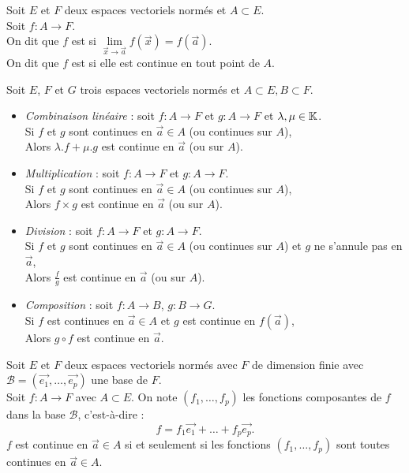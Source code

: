 \documentclass{book}
\begin{document}
\begin{Definition}[Continuité]
Soit $E$ et $F$ deux espaces vectoriels normés et $A\subset E$.\\
Soit $f:A\to F$.\\
On dit que $f$ est  si $\lim\limits_{\vec{x}\to\vec{a} } f(\vec{x})= f(\vec{a})$.\\
On dit que $f$ est  si elle est continue en tout point de $A$.
\end{Definition}
\begin{Definition}
Soit $E$, $F$ et $G$ trois espaces vectoriels normés et $A\subset E, B\subset F$.
\begin{itemize}
\item \textit{Combinaison linéaire} :  soit $f:A\to F$ et $g:A\to F$ et $\lambda,\mu\in\mathbb{K}$.\\
Si $f$ et $g$ sont continues en $\vec{a}\in A$ (ou continues sur $A$),\\
Alors $\lambda.f + \mu.g$ est continue en $\vec{a}$ (ou sur $A$).
\item\textit{Multiplication} :  soit $f:A\to F$ et $g:A\to F$.\\
Si $f$ et $g$ sont continues en $\vec{a}\in A$ (ou continues sur $A$),\\
Alors $f \times g$ est continue en $\vec{a}$ (ou sur $A$).
\item\textit{Division} :  soit $f:A\to F$ et $g:A\to F$.\\
Si $f$ et $g$ sont continues en $\vec{a}\in A$ (ou continues sur $A$) et $g$ ne s'annule pas en $\vec{a}$,\\
Alors $\frac{f}{g}$ est continue en $\vec{a}$ (ou sur $A$).
\item\textit{Composition} :  soit $f:A\to B$, $g:B\to G$.\\
Si $f$ est continues en $\vec{a}\in A$ et $g$ est continue en $f(\vec{a})$,\\
Alors $g\circ f$ est continue en $\vec{a}$.
\end{itemize}
\end{Definition}
\begin{Proposition}
Soit $E$ et $F$ deux espaces vectoriels normés avec $F$ de dimension finie avec $\mathcal{B}=(\vec{e_1},\dots, \vec{e_p})$ une base de $F$.\\
Soit $f:A\to F$ avec $A\subset E$.
On note  $(f_1, \dots, f_p)$ les fonctions composantes de $f $dans la base
$\mathcal{B}$, c'est-à-dire : $$f=f_1\vec{e_1}+\dots + f_p\vec{e_p}.$$
$f$ est continue en $\vec{a}\in A$ si et seulement si les fonctions $(f_1, \dots, f_p)$ sont toutes continues en $\vec{a}\in A$.
\end{Proposition}
\end{document}
